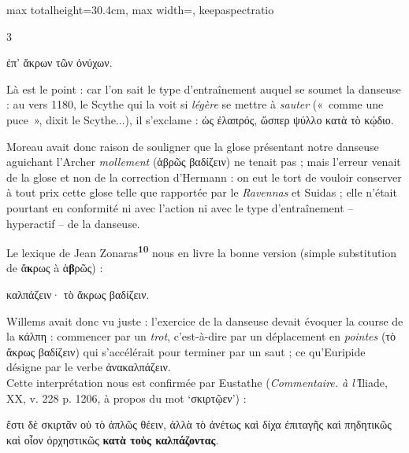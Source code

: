 \documentclass[11pt,twoside]{book}
\newcommand{\italique}[1]{\textit{#1}}
\newcommand{\citComm}[1]{\begin{quoting}[vskip=0.4pt,leftmargin=0.7em,rightmargin=0.2em]#1\end{quoting}}
\newcommand{\marqueur}[1]{\textsuperscript{\color{rubricRed}\textbf{#1}}}
\begin{document}
\begin{adjustbox}{max totalheight=30.4cm, max width=\textwidth, keepaspectratio}
\begin{minipage}{\textwidth}
{\begin{multicols}{3}
\citComm{ἐπ' ἄκρων τῶν ὀνύχων.}
\par\vspace{1.5pt}
\noindent Là est le point : car l'on sait le type d'entraînement auquel se soumet la danseuse : au vers 1180, le Scythe qui la voit si \italique{légère} se mettre à \italique{sauter} («~comme une puce~», dixit le Scythe...), il s'exclame : ὡς ἐλαπρός, ὥσπερ ψύλλο κατὰ τὸ κῴδιο.
\par\vspace{1.5pt}
\noindent Moreau avait donc raison de souligner que la glose présentant notre danseuse aguichant l'Archer \italique{mollement} (ἁβρῶς βαδίζειν) ne tenait pas ; mais l'erreur venait de la glose et non de la correction d'Hermann : on eut le tort de vouloir conserver à tout prix cette glose telle que rapportée par le \italique{Ravennas} et Suidas ; elle n'était pourtant en conformité ni avec l'action ni avec le type d'entraînement -- hyperactif -- de la danseuse.
\par\vspace{1.5pt}
\noindent Le lexique de Jean Zonaras\marqueur{10} nous en livre la bonne version (simple substitution de ἄ\textbf{κ}ρως à ἁ\textbf{β}ρῶς) :
\citComm{καλπάζειν· τὸ ἄκρως βαδίζειν.}
\par\vspace{1.5pt}
\noindent Willems avait donc vu juste : l'exercice de la danseuse devait évoquer la course de la κάλπη : commencer par un \italique{trot}, c'est-à-dire par un déplacement en \italique{pointes} (τὸ ἄκρως βαδίζειν) qui s'accélérait pour terminer par un saut ; ce qu'Euripide désigne par le verbe ἀνακαλπάζειν.\\ Cette interprétation nous est confirmée par Eustathe (\italique{Commentaire. à l'}Iliade, XX, v. 228 p. 1206, à propos du mot `σκιρτῷεν') :
\citComm{
ἔστι δὲ σκιρτᾶν οὐ τὸ ἁπλῶς θέειν, ἀλλὰ τὸ ἀνέτως καὶ δίχα ἐπιταγῆς καὶ πηδητικῶς καὶ οἷον ὀρχηστικῶς \textbf{κατὰ τοὺς καλπάζοντας}.\\

}
\end{multicols}}
\end{minipage}
\end{adjustbox}
\end{document}
